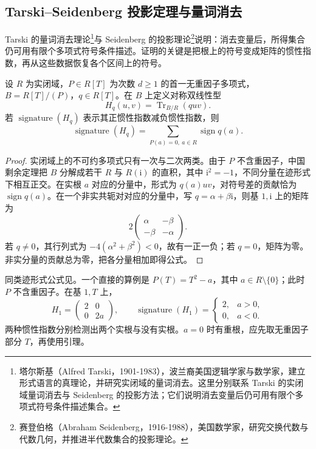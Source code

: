 \subsection{Tarski–Seidenberg 投影定理与量词消去}
\label{b3:subsec:G01:02}

Tarski 的量词消去理论\footnote{塔尔斯基（Alfred Tarski，1901-1983），波兰裔美国逻辑学家与数学家，建立形式语言的真理论，并研究实闭域的量词消去。这里分别联系 Tarski 的实闭域量词消去与 Seidenberg 的投影方法；它们说明消去变量后仍可用有限个多项式符号条件描述集合。}与 Seidenberg 的投影理论\footnote{赛登伯格（Abraham Seidenberg，1916-1988），美国数学家，研究交换代数与代数几何，并推进半代数集合的投影理论。}说明：消去变量后，所得集合仍可用有限个多项式符号条件描述。证明的关键是把根上的符号变成矩阵的惯性指数，再从这些数据恢复各个区间上的符号。

\begin{lemma}[迹形式的符号计数]\label{b3:lem:G-trace-sign-count}
	设 \(R\) 为实闭域，\(P\in R[T]\) 为次数 \(d\ge1\) 的首一无重因子多项式，\(B=R[T]/(P)\)，\(q\in R[T]\)。在 \(B\) 上定义对称双线性型
	\[
		H_q(u,v)=\operatorname{Tr}_{B/R}(quv).
	\]
	若 \(\operatorname{signature}(H_q)\) 表示其正惯性指数减负惯性指数，则
	\[
		\operatorname{signature}(H_q) =\sum_{P(a)=0,\ a\in R}\operatorname{sign}q(a).
	\]
\end{lemma}
\begin{proof}
	实闭域上的不可约多项式只有一次与二次两类。由于 \(P\) 不含重因子，中国剩余定理把 \(B\) 分解成若干 \(R\) 与 \(R(\mathrm i)\) 的直积，其中 \(\mathrm i^2=-1\)，不同分量在迹形式下相互正交。在实根 \(a\) 对应的分量中，形式为 \(q(a)uv\)，对符号差的贡献恰为 \(\operatorname{sign}q(a)\)。在一个非实共轭对对应的分量中，写 \(q=\alpha+\beta\mathrm i\)，则基 \(1,\mathrm i\) 上的矩阵为
	\[
		2\begin{pmatrix}\alpha&-\beta\\-\beta&-\alpha\end{pmatrix}.
	\]
	若 \(q\ne0\)，其行列式为 \(-4(\alpha^2+\beta^2)<0\)，故有一正一负；若 \(q=0\)，矩阵为零。非实分量的贡献总为零，把各分量相加即得公式。
\end{proof}

同类迹形式公式见\cite[Section 2.4, Theorem 2.8]{Sturmfels2002PolynomialEquations}。一个直接的算例是 \(P(T)=T^2-a\)，其中 \(a\in R\setminus\{0\}\)；此时 \(P\) 不含重因子。在基 \(1,T\) 上，
\[
	H_1=\begin{pmatrix}2&0\\0&2a\end{pmatrix},\qquad
	\operatorname{signature}(H_1)=
	\begin{cases}2,&a>0,\\0,&a<0.\end{cases}
\]
两种惯性指数分别检测出两个实根与没有实根。\(a=0\) 时有重根，应先取无重因子部分 \(T\)，再使用引理。


